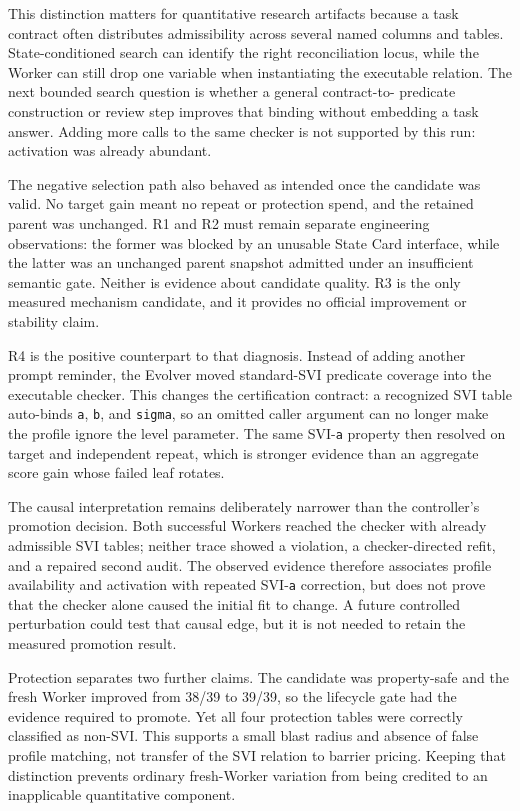 This distinction matters for quantitative research artifacts because a task
contract often distributes admissibility across several named columns and
tables. State-conditioned search can identify the right reconciliation locus,
while the Worker can still drop one variable when instantiating the executable
relation. The next bounded search question is whether a general contract-to-
predicate construction or review step improves that binding without embedding
a task answer. Adding more calls to the same checker is not supported by this
run: activation was already abundant.

The negative selection path also behaved as intended once the candidate was
valid. No target gain meant no repeat or protection spend, and the retained
parent was unchanged. R1 and R2 must remain separate engineering observations:
the former was blocked by an unusable State Card interface, while the latter
was an unchanged parent snapshot admitted under an insufficient semantic gate.
Neither is evidence about candidate quality. R3 is the only measured mechanism
candidate, and it provides no official improvement or stability claim.

R4 is the positive counterpart to that diagnosis. Instead of adding another
prompt reminder, the Evolver moved standard-SVI predicate coverage into the
executable checker. This changes the certification contract: a recognized SVI
table auto-binds \texttt{a}, \texttt{b}, and \texttt{sigma}, so an omitted
caller argument can no longer make the profile ignore the level parameter. The
same SVI-\texttt{a} property then resolved on target and independent repeat,
which is stronger evidence than an aggregate score gain whose failed leaf
rotates.

The causal interpretation remains deliberately narrower than the controller's
promotion decision. Both successful Workers reached the checker with already
admissible SVI tables; neither trace showed a violation, a checker-directed
refit, and a repaired second audit. The observed evidence therefore associates
profile availability and activation with repeated SVI-\texttt{a} correction,
but does not prove that the checker alone caused the initial fit to change. A
future controlled perturbation could test that causal edge, but it is not
needed to retain the measured promotion result.

Protection separates two further claims. The candidate was property-safe and
the fresh Worker improved from 38/39 to 39/39, so the lifecycle gate had the
evidence required to promote. Yet all four protection tables were correctly
classified as non-SVI. This supports a small blast radius and absence of false
profile matching, not transfer of the SVI relation to barrier pricing. Keeping
that distinction prevents ordinary fresh-Worker variation from being credited
to an inapplicable quantitative component.

